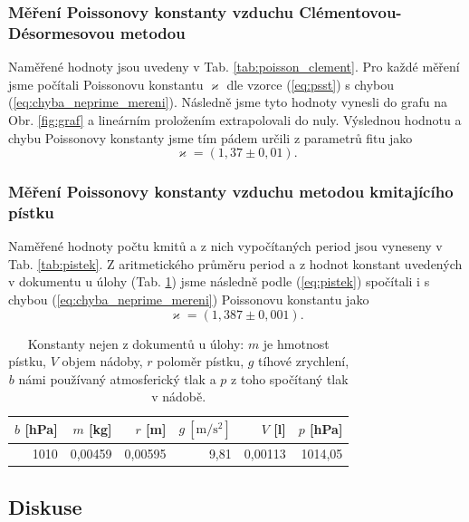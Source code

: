 \documentclass[english]{article}
\newcommand{\unit}[1]{\mathrm{#1}}
\begin{document}
			\subsubsection{Měření Poissonovy konstanty vzduchu Clémentovou-Désormesovou metodou}
					Naměřené hodnoty jsou uvedeny v Tab. \ref{tab:poisson_clement}. Pro každé měření jsme počítali Poissonovu konstantu $\varkappa$ dle vzorce (\ref{eq:psst}) s chybou (\ref{eq:chyba_neprime_mereni}). Následně jsme tyto hodnoty vynesli do grafu na Obr. \ref{fig:graf} a lineárním proložením extrapolovali do nuly. Výslednou hodnotu a chybu Poissonovy konstanty jsme tím pádem určili z parametrů fitu jako
				   \begin{equation}
				   		\varkappa = (1,37\pm0,01).
				   \end{equation}
				   

							
			\subsubsection{Měření Poissonovy konstanty vzduchu metodou kmitajícího pístku}
					Naměřené hodnoty počtu kmitů a z nich vypočítaných period jsou vyneseny v Tab. \ref{tab:pistek}. Z aritmetického průměru period a z hodnot konstant uvedených v dokumentu u úlohy (Tab. \ref{tab:konstanty}) jsme následně podle (\ref{eq:pistek}) spočítali i s chybou (\ref{eq:chyba_neprime_mereni}) Poissonovu konstantu jako
					\begin{equation}
				   		\varkappa = (1,387\pm0,001).
				   \end{equation}

\begin{table}[h!]
  \centering
    \begin{tabular}{rrrrrr}
    \toprule
    $b$ [hPa] & $m$ [kg] & $r$ [m] & $g \unit{\ [m/s^2]}$ & $V$ [l] & $p$ [hPa] \\
    \midrule
    1010  & 0,00459 & 0,00595 & 9,81  & 0,00113 & 1014,05 \\
    \bottomrule
    \end{tabular}%
 \caption{Konstanty nejen z dokumentů u úlohy: $m$ je hmotnost pístku, $V$ objem nádoby, $r$ poloměr pístku, $g$ tíhové zrychlení, $b$ námi používaný atmosferický tlak a $p$ z toho spočítaný tlak v nádobě.}
   \label{tab:konstanty}%
\end{table}%
				   
							
	\subsection{Diskuse}
\end{document}
